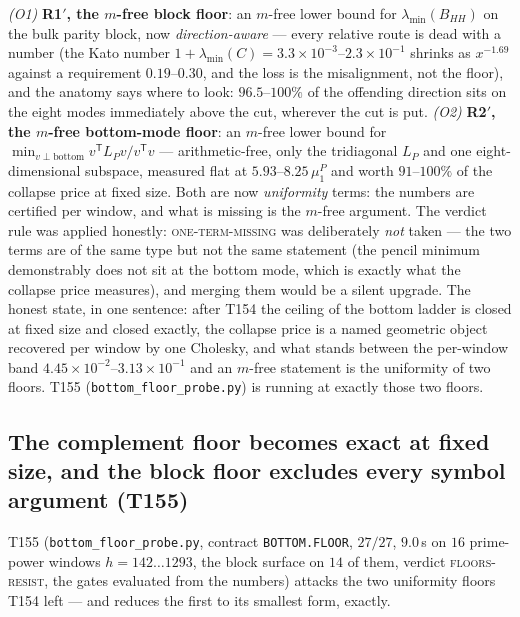\documentclass[11pt,a4paper]{article}
\begin{document}
\begin{keybox}
\emph{(O1)} \textbf{R1$'$, the $m$-free block floor}: an $m$-free lower bound for
$\lambda_{\min}(B_{HH})$ on the bulk parity block, now \emph{direction-aware} --- every
relative route is dead with a number (the Kato number
$1+\lambda_{\min}(C)=3.3\times10^{-3}$--$2.3\times10^{-1}$ shrinks as $x^{-1.69}$ against
a requirement $0.19$--$0.30$, and the loss is the misalignment, not the floor), and the
anatomy says where to look: $96.5$--$100\%$ of the offending direction sits on the eight
modes immediately above the cut, wherever the cut is put. \emph{(O2)} \textbf{R2$'$, the
$m$-free bottom-mode floor}: an $m$-free lower bound for
$\min_{v\perp\mathrm{bottom}}v^{\mathsf T}L_Pv/v^{\mathsf T}v$ --- arithmetic-free, only
the tridiagonal $L_P$ and one eight-dimensional subspace, measured flat at
$5.93$--$8.25\,\mu^P_1$ and worth $91$--$100\%$ of the collapse price at fixed size. Both
are now \emph{uniformity} terms: the numbers are certified per window, and what is
missing is the $m$-free argument. The verdict rule was applied honestly:
\textsc{one-term-missing} was deliberately \emph{not} taken --- the two terms are of the
same type but not the same statement (the pencil minimum demonstrably does not sit at the
bottom mode, which is exactly what the collapse price measures), and merging them would
be a silent upgrade. The honest state, in one sentence: after T154 the ceiling of the
bottom ladder is closed at fixed size and closed exactly, the collapse price is a named
geometric object recovered per window by one Cholesky, and what stands between the
per-window band $4.45\times10^{-2}$--$3.13\times10^{-1}$ and an $m$-free statement is the
uniformity of two floors.
T155 (\texttt{bottom\_floor\_probe.py}) is running at exactly those two floors.
\end{keybox}

\subsection{The complement floor becomes exact at fixed size, and the block floor excludes
every symbol argument (T155)}
T155 (\texttt{bottom\_floor\_probe.py}, contract \texttt{BOTTOM.FLOOR}, $27/27$, $9.0$\,s on
$16$ prime-power windows $h=142\ldots1293$, the block surface on $14$ of them, verdict
\textsc{floors-resist}, the gates evaluated from the numbers) attacks the two uniformity
floors T154 left --- and reduces the first to its smallest form, exactly.
\end{document}
